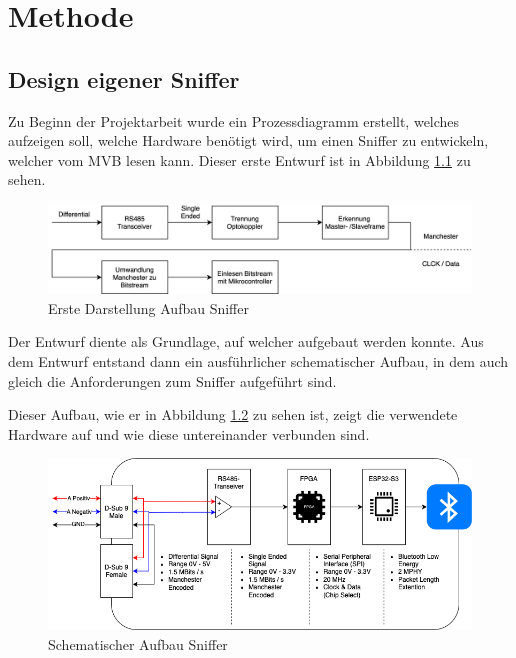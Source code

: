 \chapter{Methode} %
\label{chapter3:Methode} %

\section{Design eigener Sniffer}
\label{Design Sniffer}

Zu Beginn der Projektarbeit wurde ein Prozessdiagramm erstellt, welches aufzeigen soll, welche Hardware benötigt wird, um einen Sniffer zu entwickeln, welcher vom MVB lesen kann.
Dieser erste Entwurf ist in Abbildung \ref{fig:AufbauSnifferDraft} zu sehen.

\begin{figure}[H]
    \centering
    \includegraphics[width=1\linewidth]{Figures/Chap3/Design Eigener Sniffer/Draft_Aufbau_Sniffer.png}
    \caption{Erste Darstellung Aufbau Sniffer}
    \label{fig:AufbauSnifferDraft}
\end{figure}

Der Entwurf diente als Grundlage, auf welcher aufgebaut werden konnte. Aus dem Entwurf entstand dann
ein ausführlicher schematischer Aufbau, in dem auch gleich die Anforderungen zum Sniffer aufgeführt
sind. 

Dieser Aufbau, wie er in Abbildung \ref{fig:AufbauSniffer} zu sehen ist, zeigt die verwendete Hardware
auf und wie diese untereinander verbunden sind.

\begin{figure}[H]
    \centering
    \includegraphics[width=0.9\linewidth]{Figures/Chap3/Design Eigener Sniffer/Aufbau_Sniffer.png}
    \caption{Schematischer Aufbau Sniffer}
    \label{fig:AufbauSniffer}
\end{figure}


